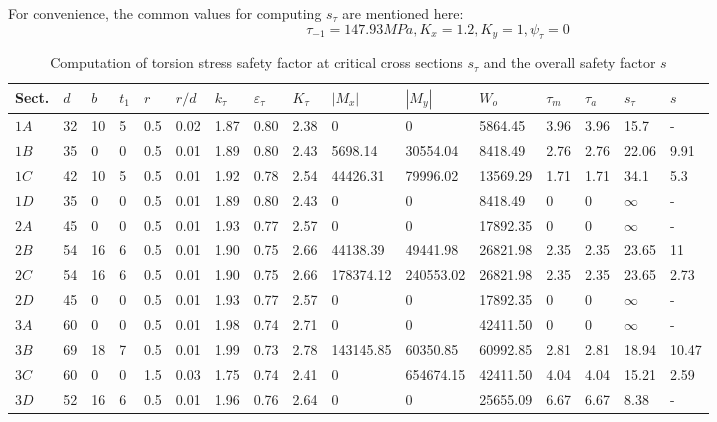 \begin{landscape}
	For convenience, the common values for computing $ s_\tau $ are mentioned here:
	\[
	\tau_{-1} = 147.93 \unit{MPa}, K_x = 1.2, K_y = 1, \psi_\tau = 0
	\]
	\begin{table}[ht]
		\renewcommand{\arraystretch}{1.5}
		\centering
		\caption{Computation of torsion stress safety factor at critical cross sections $ s_\tau $ and the overall safety factor $ s $}
		\begin{tabular}{llllllllllllllll}\toprule
			Sect. 	& $ d $ & $ b $ & $ t_1 $ & $ r $ & $ r/d $ & $ k_\tau $ & $ \varepsilon_\tau $ & $ K_\tau $ & $ |M_x| $ & $ |M_y| $ & $ W_o $ & $ \tau_m $ & $ \tau_a $ & $ s_\tau $ & $ s $ \\ \midrule
			$ 1A $	&	32	&	10	&	5	&	0.5	&	0.02	&	1.87	&	0.80	&	2.38	&	0			&	0			&	5864.45		&	3.96	&	3.96	&	15.7		&	-   	\\
			$ 1B $	&	35	&	0	&	0	&	0.5	&	0.01	&	1.89	&	0.80	&	2.43	&	5698.14		&	30554.04	&	8418.49		&	2.76	&	2.76	&	22.06		&	9.91	\\
			$ 1C $	&	42	&	10	&	5	&	0.5	&	0.01	&	1.92	&	0.78	&	2.54	&	44426.31	&	79996.02	&	13569.29	&	1.71	&	1.71	&	34.1		&	5.3	\\
			$ 1D $	&	35	&	0	&	0	&	0.5	&	0.01	&	1.89	&	0.80	&	2.43	&	0			&	0			&	8418.49		&	0		&	0		&	$ \infty $	&	-   	\\
			$ 2A $	&	45	&	0	&	0	&	0.5	&	0.01	&	1.93	&	0.77	&	2.57	&	0			&	0			&	17892.35	&	0		&	0		&	$ \infty $	&	-   	\\
			$ 2B $	&	54	&	16	&	6	&	0.5	&	0.01	&	1.90	&	0.75	&	2.66	&	44138.39	&	49441.98	&	26821.98	&	2.35	&	2.35	&	23.65		&	11	\\
			$ 2C $	&	54	&	16	&	6	&	0.5	&	0.01	&	1.90	&	0.75	&	2.66	&	178374.12	&	240553.02	&	26821.98	&	2.35	&	2.35	&	23.65		&	2.73	\\
			$ 2D $	&	45	&	0	&	0	&	0.5	&	0.01	&	1.93	&	0.77	&	2.57	&	0			&	0			&	17892.35	&	0		&	0		&	$ \infty $	&	-   	\\
			$ 3A $	&	60	&	0	&	0	&	0.5	&	0.01	&	1.98	&	0.74	&	2.71	&	0			&	0			&	42411.50	&	0		&	0		&	$ \infty $	&	-		\\
			$ 3B $	&	69	&	18	&	7	&	0.5	&	0.01	&	1.99	&	0.73	&	2.78	&	143145.85	&	60350.85	&	60992.85	&	2.81	&	2.81	&	18.94		&	10.47	\\
			$ 3C $	&	60	&	0	&	0	&	1.5	&	0.03	&	1.75	&	0.74	&	2.41	&	0			&	654674.15	&	42411.50	&	4.04	&	4.04	&	15.21		&	2.59	\\
			$ 3D $	&	52	&	16	&	6	&	0.5	&	0.01	&	1.96	&	0.76	&	2.64	&	0			&	0			&	25655.09	&	6.67	&	6.67	&	8.38		&	-	\\
			\bottomrule
		\end{tabular}
		\label{safety-tau}
	\end{table}
\end{landscape}

